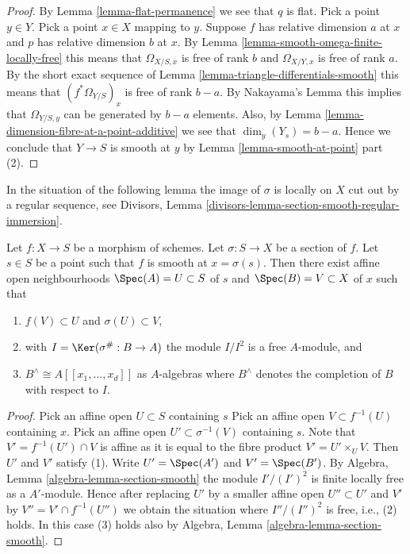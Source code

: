 \begin{proof}
By Lemma \ref{lemma-flat-permanence} we see that $q$ is flat.
Pick a point $y \in Y$. Pick a point $x \in X$ mapping to $y$.
Suppose $f$ has relative dimension $a$ at $x$ and $p$ has relative
dimension $b$ at $x$. By Lemma \ref{lemma-smooth-omega-finite-locally-free}
this means that $\Omega_{X/S, x}$ is free of rank $b$ and $\Omega_{X/Y, x}$
is free of rank $a$. By the short exact sequence
of Lemma \ref{lemma-triangle-differentials-smooth}
this means that $(f^*\Omega_{Y/S})_x$ is free
of rank $b - a$. By Nakayama's Lemma this implies that
$\Omega_{Y/S, y}$ can be generated by $b - a$ elements.
Also, by Lemma \ref{lemma-dimension-fibre-at-a-point-additive} we see that
$\dim_y(Y_s) = b - a$. Hence we conclude that
$Y \to S$ is smooth at $y$ by Lemma \ref{lemma-smooth-at-point} part (2).
\end{proof}

\noindent
In the situation of the following lemma the image of $\sigma$ is
locally on $X$ cut out by a regular sequence, see
Divisors, Lemma \ref{divisors-lemma-section-smooth-regular-immersion}.

\begin{lemma}
\label{lemma-section-smooth-morphism}
Let $f : X \to S$ be a morphism of schemes.
Let $\sigma : S \to X$ be a section of $f$.
Let $s \in S$ be a point such that $f$ is smooth at $x = \sigma(s)$.
Then there exist affine open neighbourhoods
$\Spec(A) = U \subset S$ of $s$ and $\Spec(B) = V \subset X$
of $x$ such that
\begin{enumerate}
\item $f(V) \subset U$ and $\sigma(U) \subset V$,
\item with $I = \Ker(\sigma^\# : B \to A)$ the module $I/I^2$
is a free $A$-module, and
\item $B^\wedge \cong A[[x_1, \ldots, x_d]]$ as $A$-algebras where
$B^\wedge$ denotes the completion of $B$ with respect to $I$.
\end{enumerate}
\end{lemma}

\begin{proof}
Pick an affine open $U \subset S$ containing $s$
Pick an affine open $V \subset f^{-1}(U)$ containing $x$.
Pick an affine open $U' \subset \sigma^{-1}(V)$ containing $s$.
Note that $V' = f^{-1}(U') \cap V$ is affine as it is equal to the
fibre product $V' = U' \times_U V$. Then $U'$ and $V'$ satisfy (1).
Write $U' = \Spec(A')$ and $V' = \Spec(B')$. By
Algebra, Lemma \ref{algebra-lemma-section-smooth}
the module $I'/(I')^2$ is finite locally free as a $A'$-module.
Hence after replacing $U'$ by a smaller affine open $U'' \subset U'$
and $V'$ by $V'' = V' \cap f^{-1}(U'')$ we obtain the situation where
$I''/(I'')^2$ is free, i.e., (2) holds. In this case (3) holds also by
Algebra, Lemma \ref{algebra-lemma-section-smooth}.
\end{proof}

